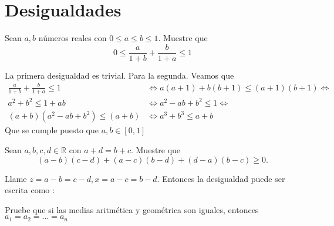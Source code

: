 \section{Desigualdades}


\begin{ejer}
		Sean $a,b$ números reales con $0\leq a \leq b\leq 1$. Muestre que
	\begin{equation}
	     0\leq \frac{a}{1+b}+\frac{b}{1+a}\leq 1
	\end{equation}
\end{ejer}
\begin{sol}
	La primera desigualdad es trivial. Para la segunda. Veamos que 
	\begin{align}
	\frac{a}{1+b}+\frac{b}{1+a} \leq 1 &\iff a(a+1) + b(b+1) \leq (a+1)(b+1) \iff \\
	a^2 + b^2 \leq 1+ab &\iff a^2-ab+b^2 \leq 1 \iff \\
	(a+b)(a^2-ab+b^2) \leq (a+b) &\iff a^3+b^3 \leq a+b
	\end{align}
	Que se cumple puesto que $a,b \in [0,1]$
\end{sol}


\begin{ejer}
		Sean $a,b,c,d \in\mathbb{R}$ con $a+d=b+c$. Muestre que
	\begin{equation}
	    (a-b)(c-d)+(a-c)(b-d)+(d-a)(b-c)\geq 0.
	\end{equation}
\end{ejer}
\begin{sol}
	Llame $z = a-b = c-d, x = a-c=b-d$. Entonces la desigualdad puede ser escrita como :
	
	
\end{sol}

\begin{ejer}
	Pruebe que si las medias aritmética y geométrica son iguales, entonces $a_{1}=a_{2}=\dots=a_{n}$
\end{ejer}

